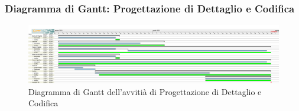 \newpage
\subsubsection{Diagramma di Gantt: Progettazione di Dettaglio e Codifica}
\begin{figure}[ht]
    \centering
    \includegraphics[width=\textwidth]{../../Immagini/GanttProgettazioneDiDettaglioECodifica}
    \caption{Diagramma di Gantt dell'avvitià di Progettazione di Dettaglio e Codifica}
\end{figure}